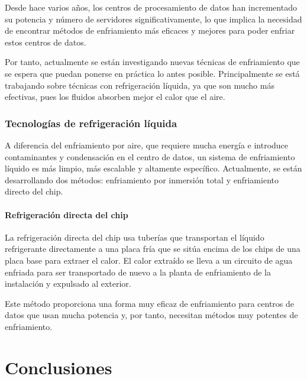 Desde hace varios años, los centros de procesamiento de datos han incrementado su potencia y número de servidores significativamente, lo que implica la necesidad de encontrar métodos de enfriamiento más eficaces y mejores para poder enfriar estos centros de datos.

Por tanto, actualmente se están investigando nuevas técnicas de enfriamiento que se espera que puedan ponerse en práctica lo antes posible. Principalmente se está trabajando sobre técnicas con refrigeración líquida, ya que son mucho más efectivas, pues los fluidos absorben mejor el calor que el aire.

\subsection{Tecnologías de refrigeración líquida}

A diferencia del enfriamiento por aire, que requiere mucha energía e introduce contaminantes y condensación en el centro de datos, un sistema de enfriamiento líquido es más limpio, más escalable y altamente específico. Actualmente, se están desarrollando dos métodos: enfriamiento por inmersión total y enfriamiento directo del chip.

\subsubsection{Refrigeración directa del chip}

La refrigeración directa del chip usa tuberías que transportan el líquido refrigerante directamente a una placa fría que se sitúa encima de los chips de una placa base para extraer el calor. El calor extraído se lleva a un circuito de agua enfriada para ser transportado de nuevo a la planta de enfriamiento de la instalación  y expulsado al exterior.

Este método proporciona una forma muy eficaz de enfriamiento para centros de datos que usan mucha potencia y, por tanto, necesitan métodos muy potentes de enfriamiento.

\chapter{Conclusiones}




